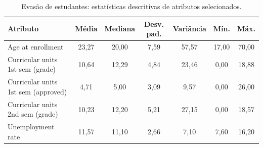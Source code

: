 \begin{table}[!t]
\centering
\caption{Evasão de estudantes: estatísticas descritivas de atributos selecionados.}
\label{tab:estudantes_estatisticas}
\begin{tabular}{lcccccc}
\hline
Atributo & Média & Mediana & Desv. pad. & Variância & Mín. & Máx. \\
\hline
Age at enrollment & 23,27 & 20,00 & 7,59 & 57,57 & 17,00 & 70,00 \\
Curricular units 1st sem (grade) & 10,64 & 12,29 & 4,84 & 23,46 & 0,00 & 18,88 \\
Curricular units 1st sem (approved) & 4,71 & 5,00 & 3,09 & 9,57 & 0,00 & 26,00 \\
Curricular units 2nd sem (grade) & 10,23 & 12,20 & 5,21 & 27,15 & 0,00 & 18,57 \\
Unemployment rate & 11,57 & 11,10 & 2,66 & 7,10 & 7,60 & 16,20 \\
\hline
\end{tabular}
\end{table}
